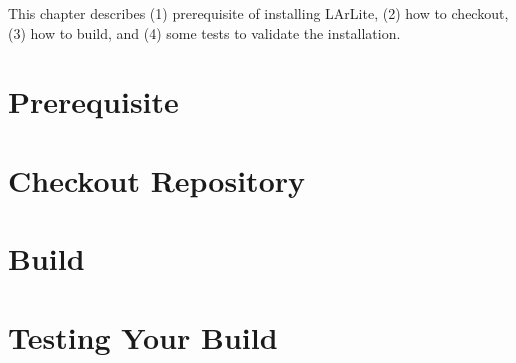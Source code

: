 
This chapter describes (1) prerequisite of installing LArLite, (2) how to checkout, (3) how to build, and (4) some tests to validate the installation.

\section{Prerequisite}
\label{sec:prerequisite}


\section{Checkout Repository}
\label{sec:checkout}


\section{Build}
\label{sec:build}


\section{Testing Your Build}
\label{sec:simpletest}


